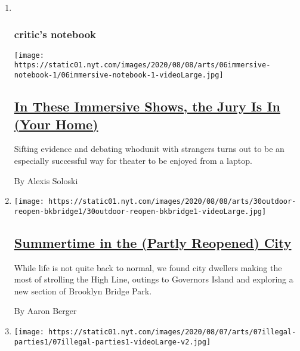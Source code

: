 \begin{enumerate}
\def\labelenumi{\arabic{enumi}.}
\item ~
  \hypertarget{critics-notebook}{%
  \subsubsection{critic's notebook}\label{critics-notebook}}

  \texttt{[image: https://static01.nyt.com/images/2020/08/08/arts/06immersive-notebook-1/06immersive-notebook-1-videoLarge.jpg]}

  \hypertarget{in-these-immersive-shows-the-jury-is-in-your-home}{%
  \subsection{\texorpdfstring{\href{/2020/08/07/theater/immersive-shows-jury-duty-eschaton.html}{In
  These Immersive Shows, the Jury Is In (Your
  Home)}}{In These Immersive Shows, the Jury Is In (Your Home)}}\label{in-these-immersive-shows-the-jury-is-in-your-home}}

  Sifting evidence and debating whodunit with strangers turns out to be
  an especially successful way for theater to be enjoyed from a laptop.

  By Alexis Soloski
\item
  \texttt{[image: https://static01.nyt.com/images/2020/08/08/arts/30outdoor-reopen-bkbridge1/30outdoor-reopen-bkbridge1-videoLarge.jpg]}

  \hypertarget{summertime-in-the-partly-reopened-city}{%
  \subsection{\texorpdfstring{\href{/2020/08/07/arts/design/high-line-governors-island-brooklyn-bridge-park.html}{Summertime
  in the (Partly Reopened)
  City}}{Summertime in the (Partly Reopened) City}}\label{summertime-in-the-partly-reopened-city}}

  While life is not quite back to normal, we found city dwellers making
  the most of strolling the High Line, outings to Governors Island and
  exploring a new section of Brooklyn Bridge Park.

  By Aaron Berger
\item
  \texttt{[image: https://static01.nyt.com/images/2020/08/07/arts/07illegal-parties1/07illegal-parties1-videoLarge-v2.jpg]}

  \hypertarget{at-europes-illegal-parties-the-virus-is-the-last-thing-on-anyones-mind}{%
}
\end{enumerate}
